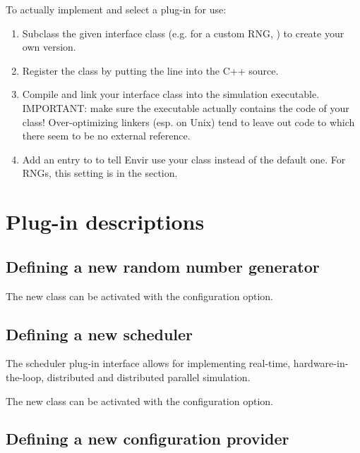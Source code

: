 To actually implement and select a plug-in for use:

\begin{enumerate}
   \item Subclass the given interface class (e.g. for a custom RNG, )
     to create your own version.
   \item Register the class by putting the 
     line into the C++ source.
   \item Compile and link your interface class into the {\opp} simulation
     executable. IMPORTANT: make sure the executable actually contains
     the code of your class! Over-optimizing linkers (esp. on Unix)
     tend to leave out code to which there seem to be no external reference.
   \item Add an entry to  to tell Envir use your class
     instead of the default one. For RNGs, this setting is 
     in the \ttt{[General]} section.
\end{enumerate}


\section{Plug-in descriptions}


\subsection{Defining a new random number generator}
\label{sec:plugin-exts:rng}


The new class can be activated with the 
configuration option.


\subsection{Defining a new scheduler}
\label{sec:plugin-exts:scheduler}

The scheduler plug-in interface allows for implementing real-time,
hardware-in-the-loop, distributed and distributed parallel simulation.

The new class can be activated with the 
configuration option.


\subsection{Defining a new configuration provider}
\label{sec:plugin-exts:configuration}

